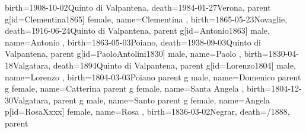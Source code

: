 \documentclass{article}
\begin{document}
\begin{midpage}
\begin{center}
\begin{genealogypicture}
{{{{                birth={1908-10-02}{Quinto di Valpantena},
                death={1984-01-27}{Verona},
            }
            parent{
                g[id=Clementina1865]{
                    female,
                    name={Clementina },
                    birth={1865-05-23}{Novaglie},
                    death={1916-06-24}{Quinto di Valpantena},
                }
            }
            parent{
                g[id=Antonio1863]{
                    male,
                    name={Antonio },
                    birth={1863-05-03}{Poiano},
                    death={1938-09-03}{Quinto di Valpantena},
                }
                parent{
                    g[id=PaoloAntolini1830]{
                        male,
                        name={Paolo },
                        birth={1830-04-18}{Valgatara},
                        death={1894}{Quinto di Valpantena},
                    }
                    parent{
                        g[id=Lorenzo1804]{
                            male,
                            name={Lorenzo },
                            birth={1804-03-03}{Poiano}
                        }
                        parent{
                            g{
                                male,
                                name={Domenico }
                            }
                        }
                        parent{
                            g{
                                female,
                                name={Catterina}
                            }
                        }
                    }
                    parent{
                        g{
                            female,
                            name={Santa Angela },
                            birth={1804-12-30}{Valgatara},
                        }
                        parent{
                            g{
                                male,
                                name={Santo }
                            }
                        }
                        parent{
                            g{
                                female,
                                name={Angela}
                            }
                        }
                    }
                }
                p[id=RosaXxxx]{
                    female,
                    name={Rosa },
                    birth={1836-03-02}{Negrar},
                    death={/1888}{},
                }
            }
        }
    }
    parent{
}}
\end{genealogypicture}
\end{center}
\end{midpage}
\end{document}
